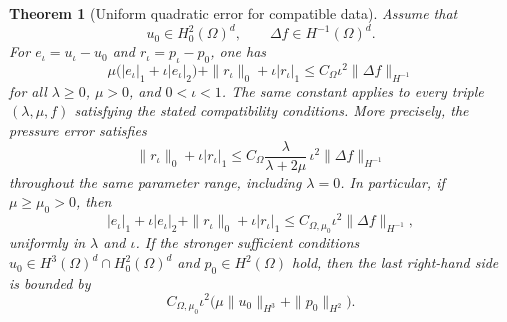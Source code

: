 \documentclass[11pt,a4paper]{article}
\newtheorem{theorem}{Theorem}[section]
\theoremstyle{remark}
\numberwithin{equation}{section}
\begin{document}
\begin{theorem}[Uniform quadratic error for compatible data]
\label{comp:uniform}
Assume that
\[
 u_0\in H^2_0(\Omega)^d,
 \qquad \Delta f\in H^{-1}(\Omega)^d.
\]
For $e_\iota=u_\iota-u_0$ and $r_\iota=p_\iota-p_0$, one has
\begin{equation}\label{comp:weighted-error}
 \mu\bigl(|e_\iota|_1+\iota|e_\iota|_2\bigr)
 +\|r_\iota\|_0+\iota|r_\iota|_1
 \le C_\Omega\iota^2\|\Delta f\|_{H^{-1}}
\end{equation}
for all $\lambda\ge0$, $\mu>0$, and $0<\iota<1$.
The same constant applies to every triple $(\lambda,\mu,f)$ satisfying
the stated compatibility conditions.
More precisely, the pressure error satisfies
\begin{equation}\label{comp:pressure-material-factor}
 \|r_\iota\|_0+\iota|r_\iota|_1
 \le C_\Omega\frac{\lambda}{\lambda+2\mu}\,
             \iota^2\|\Delta f\|_{H^{-1}}
\end{equation}
throughout the same parameter range, including $\lambda=0$.
In particular, if $\mu\ge\mu_0>0$, then
\begin{equation}\label{comp:four-error}
 |e_\iota|_1+\iota|e_\iota|_2
 +\|r_\iota\|_0+\iota|r_\iota|_1
 \le C_{\Omega,\mu_0}\iota^2\|\Delta f\|_{H^{-1}},
\end{equation}
uniformly in $\lambda$ and $\iota$. If the stronger sufficient conditions
$u_0\in H^3(\Omega)^d\cap H^2_0(\Omega)^d$ and $p_0\in H^2(\Omega)$
hold, then the last right-hand side is bounded by
\[
 C_{\Omega,\mu_0}\iota^2
       \bigl(\mu\|u_0\|_{H^3}+\|p_0\|_{H^2}\bigr).
\]
\end{theorem}
\end{document}
